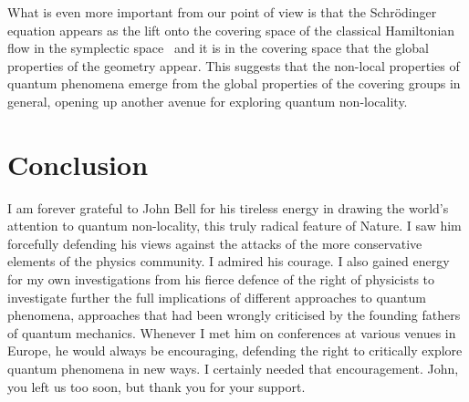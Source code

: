 \documentclass[12pt]{article}
\begin{document}
What is even more important from our point of view is that the Schr\"{o}dinger equation appears as the lift onto the covering space of the classical Hamiltonian flow in the symplectic space~\cite{vgss84, mdgbh11} and it is 
in the covering space that the global properties of the geometry appear.  This suggests  that the non-local properties of quantum phenomena emerge from the global properties of the covering groups in general, opening up another avenue for exploring quantum non-locality.


\section{Conclusion}

 I am forever grateful to John Bell for his tireless energy in drawing the world's attention to quantum non-locality, this truly radical feature of Nature.  I saw him forcefully defending his views against the attacks of the more conservative elements of the physics community.  I admired his courage. I also gained energy for my own investigations from his fierce defence of the right of physicists to investigate further the full implications of different approaches to quantum phenomena, approaches that had been wrongly criticised by the founding fathers of quantum mechanics.
 Whenever I met him on conferences at various venues in Europe, he would always be encouraging, defending the right to critically explore quantum phenomena in new ways.  I certainly needed that encouragement.  John, you left us too soon, but thank you for your support.
\end{document}
